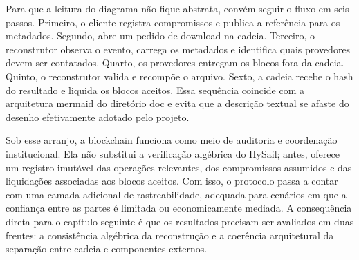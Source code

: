 Para que a leitura do diagrama não fique abstrata, convém seguir o fluxo em seis passos. Primeiro, o cliente registra compromissos e publica a referência para os metadados. Segundo, abre um pedido de download na cadeia. Terceiro, o reconstrutor observa o evento, carrega os metadados e identifica quais provedores devem ser contatados. Quarto, os provedores entregam os blocos fora da cadeia. Quinto, o reconstrutor valida e recompõe o arquivo. Sexto, a cadeia recebe o hash do resultado e liquida os blocos aceitos. Essa sequência coincide com a arquitetura mermaid do diretório doc e evita que a descrição textual se afaste do desenho efetivamente adotado pelo projeto.

Sob esse arranjo, a blockchain funciona como meio de auditoria e coordenação institucional. Ela não substitui a verificação algébrica do HySail; antes, oferece um registro imutável das operações relevantes, dos compromissos assumidos e das liquidações associadas aos blocos aceitos. Com isso, o protocolo passa a contar com uma camada adicional de rastreabilidade, adequada para cenários em que a confiança entre as partes é limitada ou economicamente mediada. A consequência direta para o capítulo seguinte é que os resultados precisam ser avaliados em duas frentes: a consistência algébrica da reconstrução e a coerência arquitetural da separação entre cadeia e componentes externos.
